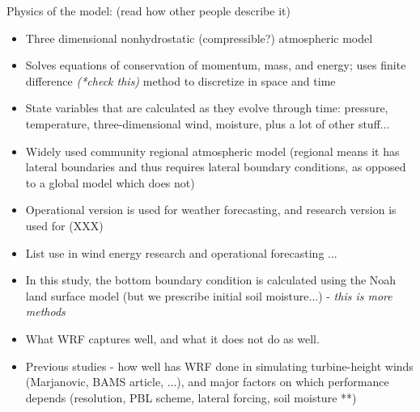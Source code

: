 \documentclass[12pt]{amsart}
\begin{document}
Physics of the model: (read how other people describe it)
\begin{itemize}
\item Three dimensional nonhydrostatic (compressible?) atmospheric model
\item Solves equations of conservation of momentum, mass, and energy; uses finite difference \textit{(*check this)} method to discretize in space and time
\item State variables that are calculated as they evolve through time: pressure, temperature, three-dimensional wind, moisture, plus a lot of other stuff...
\item Widely used community regional atmospheric model (regional means it has lateral boundaries and thus requires lateral boundary conditions, as opposed to a global model which does not)
\item Operational version is used for weather forecasting, and research version is used for (XXX)
\item List use in wind energy research and operational forecasting ...
\item In this study, the bottom boundary condition is calculated using the Noah land surface model (but we prescribe initial soil moisture...) - \textit{this is more methods}
\item What WRF captures well, and what it does not do as well.
\item Previous studies - how well has WRF done in simulating turbine-height winds (Marjanovic, BAMS article, ...), and major factors on which performance depends (resolution, PBL scheme, lateral forcing, soil moisture **)
\end{itemize}
\end{document}
